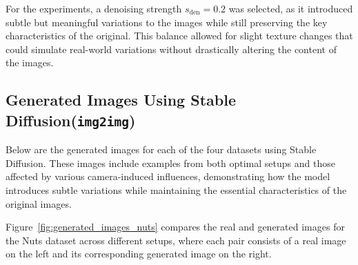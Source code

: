 \documentclass[12pt,DIV14,BCOR12mm,a4paper,footinclude=false,headinclude,parskip=half-,twoside,openright,cleardoublepage=empty,toc=index,bibliography=totoc,listof=totoc]{scrreprt}
\numberwithin{equation}{chapter}
\begin{document}
For the experiments, a denoising strength $s_{\text{den}} = 0.2$ was selected, as it introduced subtle but meaningful variations to the images while still preserving the key characteristics of the original. This balance allowed for slight texture changes that could simulate real-world variations without drastically altering the content of the images.

\subsection{Generated Images Using Stable Diffusion(\texttt{img2img})}
\label{sec:generated_images}
Below are the generated images for each of the four datasets using Stable Diffusion. These images include examples from both optimal setups and those affected by various camera-induced influences, demonstrating how the model introduces subtle variations while maintaining the essential characteristics of the original images.

Figure~\ref{fig:generated_images_nuts} compares the real and generated images for the Nuts dataset across different setups, where each pair consists of a real image on the left and its corresponding generated image on the right.
\end{document}
